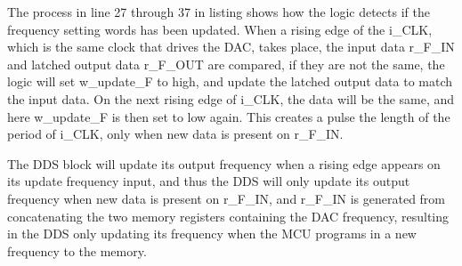     The process in line 27 through 37 in listing  shows how the logic detects if the frequency setting words has been updated. When a rising edge of the i\_CLK, which is the same clock that drives the DAC, takes place, the input data r\_F\_IN and latched output data r\_F\_OUT are compared, if they are not the same, the logic will set w\_update\_F to high, and update the latched output data to match the input data. On the next rising edge of i\_CLK, the data will be the same, and here w\_update\_F is then set to low again. This creates a pulse the length of the period of i\_CLK, only when new data is present on r\_F\_IN. 
    
    The DDS block will update its output frequency when a rising edge appears on its update frequency input, and thus the DDS will only update its output frequency when new data is present on r\_F\_IN, and r\_F\_IN is generated from concatenating the two memory registers containing the DAC frequency, resulting in the DDS only updating its frequency when the MCU programs in a new frequency to the memory.